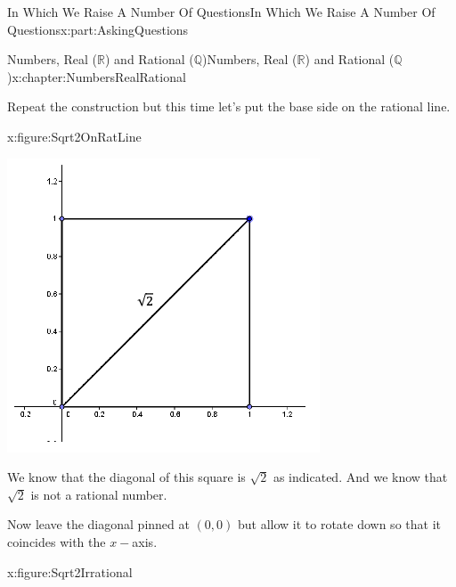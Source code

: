 \documentclass[oneside,10pt,]{book}
\numberwithin{equation}{section}
\newcommand{\RR}{\mathbb {R}}
\newcommand{\QQ}{\mathbb {Q}}
\begin{document}
\begin{partptx}{In Which We Raise A Number Of Questions}{}{In Which We Raise A Number Of Questions}{}{}{x:part:AskingQuestions}
\begin{chapterptx}{Numbers, Real (\(\RR\)) and Rational (\(\QQ\))}{}{Numbers, Real (\(\RR\)) and Rational (\(\QQ\))}{}{}{x:chapter:NumbersRealRational}
\begin{introduction}{}
\par
Repeat the construction but this time let's put the base side on the rational line.%
\begin{figureptx}{}{x:figure:Sqrt2OnRatLine}{}%
\begin{image}{0.25}{0.5}{0.25}%
\includegraphics[width=\linewidth]{images/Sqrt2OnRatLine.png}
\end{image}%
\tcblower
\end{figureptx}%
We know that the diagonal of this square is \(\sqrt{2}\) as indicated. And we know that \(\sqrt{2}\) is not a rational number.%
\par
Now leave the diagonal pinned at \((0,0)\) but allow it to rotate down so that it coincides with the \(x-\)axis.%
\begin{figureptx}{}{x:figure:Sqrt2Irrational}{}%
\begin{image}{0.25}{0.5}{0.25}%

\end{image}
\end{figureptx}
\end{introduction}
\end{chapterptx}
\end{partptx}
\end{document}
